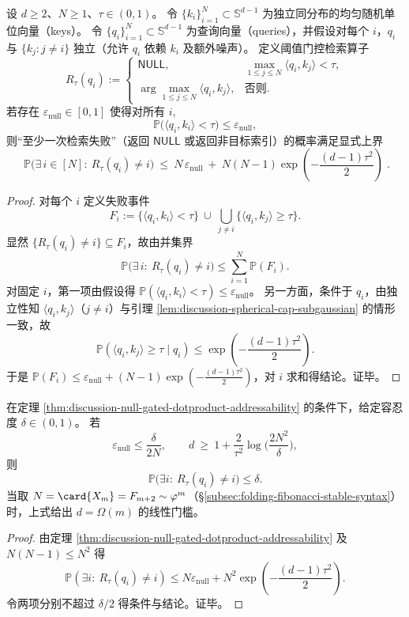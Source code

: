 \begin{theorem}[阈值门控点积检索的双预算上界]\label{thm:discussion-null-gated-dotproduct-addressability}
设 \(d\ge 2\)、\(N\ge 1\)、\(\tau\in(0,1)\)。
令 \(\{k_i\}_{i=1}^{N}\subset\mathbb{S}^{d-1}\) 为独立同分布的均匀随机单位向量（keys）。
令 \(\{q_i\}_{i=1}^{N}\subset\mathbb{S}^{d-1}\) 为查询向量（queries），并假设对每个 \(i\)，\(q_i\) 与 \(\{k_j:j\neq i\}\) 独立（允许 \(q_i\) 依赖 \(k_i\) 及额外噪声）。
定义阈值门控检索算子
\[
R_{\tau}(q_i):=
\begin{cases}
\mathsf{NULL}, & \max_{1\le j\le N}\langle q_i,k_j\rangle<\tau,\\
\arg\max_{1\le j\le N}\langle q_i,k_j\rangle, & \text{否则}.
\end{cases}
\]
若存在 \(\varepsilon_{\mathrm{null}}\in[0,1]\) 使得对所有 \(i\),
\[
\mathbb{P}\bigl(\langle q_i,k_i\rangle<\tau\bigr)\le \varepsilon_{\mathrm{null}},
\]
则“至少一次检索失败”（返回 \(\mathsf{NULL}\) 或返回非目标索引）的概率满足显式上界
\[
\boxed{\;
\mathbb{P}\Big(\exists\, i\in[N]:\ R_{\tau}(q_i)\neq i\Big)
\ \le\
N\,\varepsilon_{\mathrm{null}}
\ +\
N(N-1)\exp\!\left(-\frac{(d-1)\tau^2}{2}\right)\; }.
\]
\end{theorem}
\begin{proof}
对每个 \(i\) 定义失败事件
\[
F_i:=\{\langle q_i,k_i\rangle<\tau\}\ \cup\ \bigcup_{j\neq i}\{\langle q_i,k_j\rangle\ge \tau\}.
\]
显然 \(\{R_{\tau}(q_i)\neq i\}\subseteq F_i\)，故由并集界
\[
\mathbb{P}\Big(\exists\, i:\ R_{\tau}(q_i)\neq i\Big)\le \sum_{i=1}^{N}\mathbb{P}(F_i).
\]
对固定 \(i\)，第一项由假设得 \(\mathbb{P}(\langle q_i,k_i\rangle<\tau)\le \varepsilon_{\mathrm{null}}\)。
另一方面，条件于 \(q_i\)，由独立性知 \(\langle q_i,k_j\rangle\)（\(j\neq i\)）与引理 \ref{lem:discussion-spherical-cap-subgaussian} 的情形一致，故
\[
\mathbb{P}(\langle q_i,k_j\rangle\ge \tau\mid q_i)\le \exp\!\left(-\frac{(d-1)\tau^2}{2}\right).
\]
于是 \(\mathbb{P}(F_i)\le \varepsilon_{\mathrm{null}}+(N-1)\exp(-\frac{(d-1)\tau^2}{2})\)，对 \(i\) 求和得结论。证毕。
\end{proof}

\begin{corollary}[固定置信度下的最小 key 维数门槛]\label{cor:discussion-null-gated-dotproduct-min-d}
在定理 \ref{thm:discussion-null-gated-dotproduct-addressability} 的条件下，给定容忍度 \(\delta\in(0,1)\)。
若
\[
\varepsilon_{\mathrm{null}}\le \frac{\delta}{2N},
\qquad
d\ \ge\ 1+\frac{2}{\tau^2}\log\!\Big(\frac{2N^2}{\delta}\Big),
\]
则
\[
\mathbb{P}\bigl(\exists i:\ R_\tau(q_i)\neq i\bigr)\le \delta.
\]
当取 \(N=\card{X_m}=F_{m+2}\sim \varphi^m\)（\S\ref{subsec:folding-fibonacci-stable-syntax}）时，上式给出 \(d=\Omega(m)\) 的线性门槛。
\end{corollary}
\begin{proof}
由定理 \ref{thm:discussion-null-gated-dotproduct-addressability} 及 \(N(N-1)\le N^2\) 得
\[
\mathbb{P}(\exists i:\ R_\tau(q_i)\neq i)\le N\varepsilon_{\mathrm{null}}+N^2\exp\!\left(-\frac{(d-1)\tau^2}{2}\right).
\]
令两项分别不超过 \(\delta/2\) 得条件与结论。证毕。
\end{proof}


